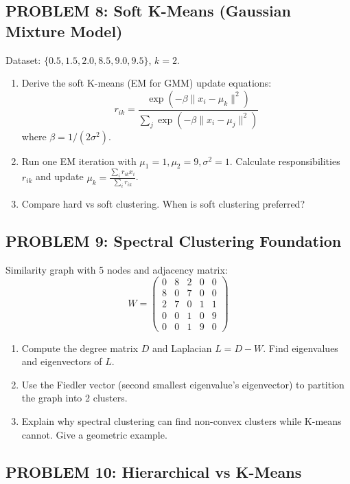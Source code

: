 \documentclass[12pt]{article}
\begin{document}
\subsection*{PROBLEM 8: Soft K-Means (Gaussian Mixture Model)}

Dataset: \(\{0.5, 1.5, 2.0, 8.5, 9.0, 9.5\}\), \(k=2\).

\begin{enumerate}
\item[(a)] Derive the soft K-means (EM for GMM) update equations: 
\[
r_{ik} = \frac{\exp(-\beta \|x_i - \mu_k\|^2)}{\sum_j \exp(-\beta \|x_i - \mu_j\|^2)}
\]
where \(\beta = 1/(2\sigma^2)\).
\item[(b)] Run one EM iteration with \(\mu_1=1, \mu_2=9, \sigma^2=1\). Calculate responsibilities \(r_{ik}\) and update \(\mu_k = \frac{\sum_i r_{ik}x_i}{\sum_i r_{ik}}\).
\item[(c)] Compare hard vs soft clustering. When is soft clustering preferred?
\end{enumerate}

\subsection*{PROBLEM 9: Spectral Clustering Foundation}

Similarity graph with 5 nodes and adjacency matrix:
\[
W = \begin{pmatrix}
0 & 8 & 2 & 0 & 0 \\
8 & 0 & 7 & 0 & 0 \\
2 & 7 & 0 & 1 & 1 \\
0 & 0 & 1 & 0 & 9 \\
0 & 0 & 1 & 9 & 0
\end{pmatrix}
\]

\begin{enumerate}
\item[(a)] Compute the degree matrix \(D\) and Laplacian \(L = D - W\). Find eigenvalues and eigenvectors of \(L\).
\item[(b)] Use the Fiedler vector (second smallest eigenvalue's eigenvector) to partition the graph into 2 clusters.
\item[(c)] Explain why spectral clustering can find non-convex clusters while K-means cannot. Give a geometric example.
\end{enumerate}

\subsection*{PROBLEM 10: Hierarchical vs K-Means}
\end{document}
